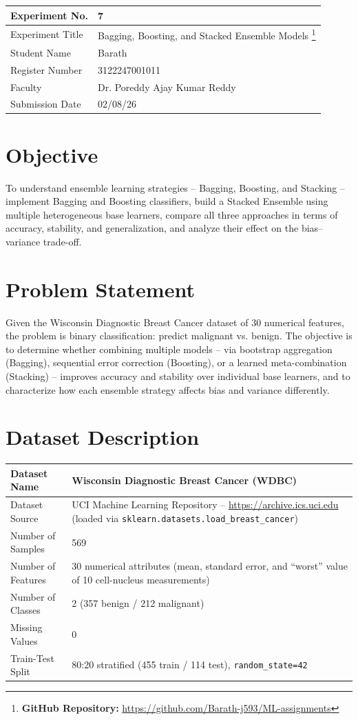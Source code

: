 \documentclass[12pt,a4paper]{article}
\begin{document}
\begin{tabular}{|p{4cm}|p{11cm}|}
\hline
Experiment No. & 7 \\ \hline
Experiment Title & Bagging, Boosting, and Stacked Ensemble Models
\footnote{\textbf{GitHub Repository: }\url{https://github.com/Barath-j593/ML-assignments}}\\ \hline

Student Name & Barath \\ \hline
Register Number & 3122247001011 \\ \hline
Faculty & Dr. Poreddy Ajay Kumar Reddy \\ \hline
Submission Date & 02/08/26 \\ \hline
\end{tabular}

\section{Objective}
To understand ensemble learning strategies -- Bagging, Boosting, and Stacking -- implement
Bagging and Boosting classifiers, build a Stacked Ensemble using multiple heterogeneous base
learners, compare all three approaches in terms of accuracy, stability, and generalization,
and analyze their effect on the bias--variance trade-off.

\section{Problem Statement}
Given the Wisconsin Diagnostic Breast Cancer dataset of 30 numerical features, the problem is
binary classification: predict malignant vs. benign. The objective is to determine whether
combining multiple models -- via bootstrap aggregation (Bagging), sequential error correction
(Boosting), or a learned meta-combination (Stacking) -- improves accuracy and stability over
individual base learners, and to characterize how each ensemble strategy affects bias and
variance differently.

\section{Dataset Description}
\begin{longtable}{|p{6cm}|p{8cm}|}
\hline
Dataset Name & Wisconsin Diagnostic Breast Cancer (WDBC) \\ \hline
Dataset Source & UCI Machine Learning Repository -- \url{https://archive.ics.uci.edu} (loaded via \texttt{sklearn.datasets.load\_breast\_cancer}) \\ \hline
Number of Samples & 569 \\ \hline
Number of Features & 30 numerical attributes (mean, standard error, and ``worst'' value of 10 cell-nucleus measurements) \\ \hline
Number of Classes & 2 (357 benign / 212 malignant) \\ \hline
Missing Values & 0 \\ \hline
Train-Test Split & 80:20 stratified (455 train / 114 test), \texttt{random\_state=42} \\ \hline
\end{longtable}
\end{document}
